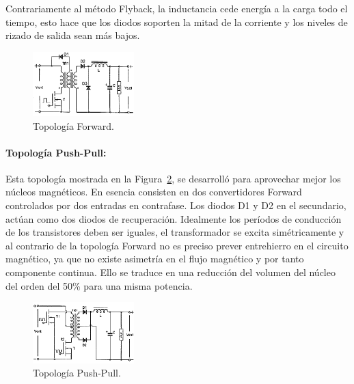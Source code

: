 Contrariamente al método Flyback, la inductancia cede energía a la carga todo el tiempo, esto hace que los diodos soporten la mitad de la corriente y los niveles de rizado de salida sean más bajos.

\begin{figure}[H]
\centering
\includegraphics[width=0.35\textwidth]{img/topo_forward.png}
\caption{Topología Forward.}
\label{topo_forward} 
\end{figure}


\paragraph*{Topología Push-Pull: }

Esta topología mostrada en la Figura~\ref{topo_pull-push},  se desarrolló para aprovechar mejor los núcleos magnéticos. En esencia consisten en dos convertidores Forward controlados por dos entradas en contrafase. Los diodos D1 y D2 en el secundario, actúan como dos diodos de recuperación. Idealmente los períodos de conducción de los transistores deben ser iguales, el transformador se excita simétricamente y al contrario de la topología Forward no es preciso prever entrehierro en el circuito magnético, ya que no existe asimetría en el flujo magnético y por tanto componente continua. Ello se traduce en una reducción del volumen del núcleo del orden del 50\% para una misma potencia.

\begin{figure}[H]
\centering
\includegraphics[width=0.35\textwidth]{img/topo_pull-push.png}
\caption{Topología Push-Pull.}
\label{topo_pull-push} 
\end{figure}



%	
